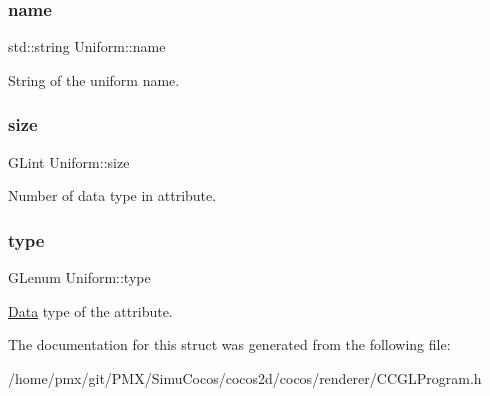 \subsubsection{\texorpdfstring{name}{name}}
{\footnotesize\ttfamily std\+::string Uniform\+::name}

String of the uniform name. \mbox{\label{structUniform_abfed1e4030d5ab97cb82b2311e573351}} 
\subsubsection{\texorpdfstring{size}{size}}
{\footnotesize\ttfamily G\+Lint Uniform\+::size}

Number of data type in attribute. \mbox{\label{structUniform_a28656c9eb79454c6f92f87b6f6917784}} 
\subsubsection{\texorpdfstring{type}{type}}
{\footnotesize\ttfamily G\+Lenum Uniform\+::type}

\hyperlink{classData}{Data} type of the attribute. 

The documentation for this struct was generated from the following file\+:\begin{DoxyCompactItemize}
\item 
/home/pmx/git/\+P\+M\+X/\+Simu\+Cocos/cocos2d/cocos/renderer/C\+C\+G\+L\+Program.\+h\end{DoxyCompactItemize}
